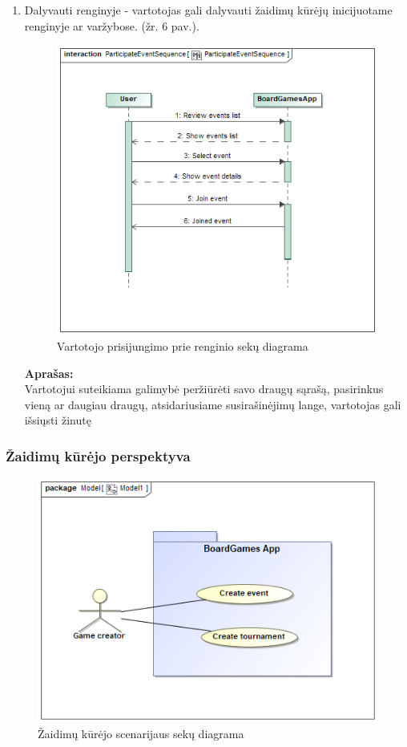 \documentclass{VUMIFPSkursinis}
\begin{document}
\begin{enumerate}
			\item Dalyvauti renginyje - vartotojas gali dalyvauti žaidimų kūrėjų 
			inicijuotame renginyje ar varžybose. (žr. 6 pav.).
				\begin{figure}[H]
					\centering
					\includegraphics[scale=0.5]{img/ParticipateEventSequence}
					\caption{Vartotojo prisijungimo prie renginio sekų diagrama}
					\label{img:ParticipateEventSequence}
				\end{figure}
				\textbf{Aprašas:}\\
					Vartotojui suteikiama galimybė peržiūrėti savo draugų sąrašą, 
					pasirinkus vieną ar daugiau draugų, atsidariusiame 
					susirašinėjimų lange, vartotojas gali išsiųsti žinutę					
			\end{enumerate}	

		\subsubsection {Žaidimų kūrėjo perspektyva}
			\begin{figure}[H]
				\centering
				\includegraphics[scale=0.5]{img/CreatorUseCase}
				\caption{Žaidimų kūrėjo scenarijaus sekų diagrama}
				\label{img:CreatorUseCase}
			\end{figure}
			
\end{document}
